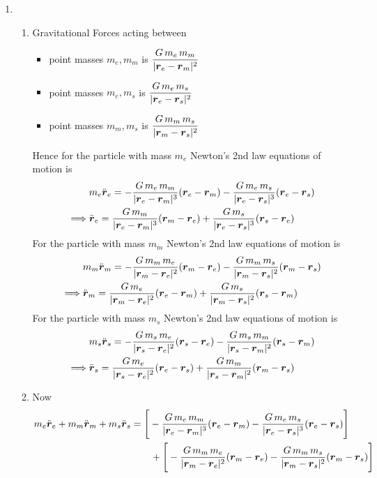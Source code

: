 \documentclass{article}
\begin{document}
\begin{enumerate}
\begin{enumerate}
\begin{itemize}
		\end{itemize}
		\end{enumerate}
		\item \begin{enumerate}
			\item Gravitational Forces acting between
			\begin{itemize}
				\item point masses $m_e,m_m$ is $\dfrac{G\, m_e\,m_m}{|\boldsymbol{r}_e-\boldsymbol{r}_m|^2}$ 
				\item point masses $m_e,m_s$ is $\dfrac{G\, m_e\,m_s}{|\boldsymbol{r}_e-\boldsymbol{r}_s|^2}$ 
				\item point masses $m_m,m_s$ is $\dfrac{G\, m_m\,m_s}{|\boldsymbol{r}_m-\boldsymbol{r}_s|^2}$ 
			\end{itemize}
		Hence for the particle with mass $m_e$ Newton’s 2nd law equations of motion is \begin{align*}
			&m_e\ddot{\boldsymbol{r}}_e=-\dfrac{G\, m_e\,m_m}{|\boldsymbol{r}_e-\boldsymbol{r}_m|^3}(\boldsymbol{r}_e-\boldsymbol{r}_m)-\dfrac{G\, m_e\,m_s}{|\boldsymbol{r}_e-\boldsymbol{r}_s|^3}(\boldsymbol{r}_e-\boldsymbol{r}_s)\\
			\implies &\ddot{\boldsymbol{r}}_e=\dfrac{G\, m_m}{|\boldsymbol{r}_e-\boldsymbol{r}_m|^3}(\boldsymbol{r}_m-\boldsymbol{r}_e)+\dfrac{G\, m_s}{|\boldsymbol{r}_e-\boldsymbol{r}_s|^3}(\boldsymbol{r}_s-\boldsymbol{r}_e)
		\end{align*}
		For the particle with mass $m_m$ Newton’s 2nd law equations of motion is \begin{align*}
			&m_m\ddot{\boldsymbol{r}}_m=-\dfrac{G\, m_m\,m_e}{|\boldsymbol{r}_m-\boldsymbol{r}_e|^2}(\boldsymbol{r}_m-\boldsymbol{r}_e)-\dfrac{G\, m_m\,m_s}{|\boldsymbol{r}_m-\boldsymbol{r}_s|^2}(\boldsymbol{r}_m-\boldsymbol{r}_s)\\
			\implies & \ddot{\boldsymbol{r}}_m=\dfrac{G\, m_e}{|\boldsymbol{r}_m-\boldsymbol{r}_e|^2}(\boldsymbol{r}_e-\boldsymbol{r}_m)+\dfrac{G\, m_s}{|\boldsymbol{r}_m-\boldsymbol{r}_s|^2}(\boldsymbol{r}_s-\boldsymbol{r}_m)
		\end{align*}
		For the particle with mass $m_s$ Newton’s 2nd law equations of motion is \begin{align*}
			& m_s\ddot{\boldsymbol{r}}_s=-\dfrac{G\, m_s\,m_e}{|\boldsymbol{r}_s-\boldsymbol{r}_e|^2}(\boldsymbol{r}_s-\boldsymbol{r}_e)-\dfrac{G\, m_s\,m_m}{|\boldsymbol{r}_s-\boldsymbol{r}_m|^2}(\boldsymbol{r}_s-\boldsymbol{r}_m)\\
			\implies&\ddot{\boldsymbol{r}}_s=\dfrac{G\,m_e}{|\boldsymbol{r}_s-\boldsymbol{r}_e|^2}(\boldsymbol{r}_e-\boldsymbol{r}_s)
			+\dfrac{G\,m_m}{|\boldsymbol{r}_s-\boldsymbol{r}_m|^2}(\boldsymbol{r}_m-\boldsymbol{r}_s)
		\end{align*}
	\item Now \begin{align*}
	&	m_e\ddot{\bmr}_e+m_m\ddot{\bmr}_m+m_s\ddot{\bmr}_s=\Bigg[-\dfrac{G\, m_e\,m_m}{|\bmr_e-\bmr_m|^3}(\bmr_e-\bmr_m)-\dfrac{G\, m_e\,m_s}{|\bmr_e-\bmr_s|^3}(\bmr_e-\bmr_s)\Bigg]\\
	&\qquad\qquad\qquad\qquad\qquad\qquad+\Bigg[-\dfrac{G\, m_m\,m_e}{|\bmr_m-\bmr_e|^2}(\bmr_m-\bmr_e)-\dfrac{G\, m_m\,m_s}{|\bmr_m-\bmr_s|^2}(\bmr_m-\bmr_s)\Bigg]\\

\end{align*}
\end{enumerate}
\end{enumerate}
\end{document}
